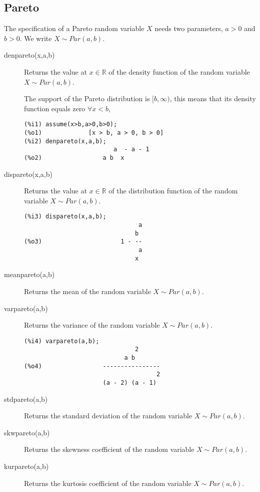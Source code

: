 \documentclass[12pt,a4paper]{article}
\newcommand{\R}{\mathbb{R}}
\begin{document}
\subsection{Pareto}

The specification of a Pareto random variable $X$ needs two parameters, $a>0$ and $b>0$. We write $X \sim Par(a,b)$.

\begin{description}

\item[denpareto(x,a,b)] Returns the value at $x \in \R$ of the density function of the random variable $X \sim Par(a,b)$.

The support of the Pareto distribution is $[b,\infty)$, this means that its density function equals zero $\forall x<b$,
\begin{verbatim}
(%i1) assume(x>b,a>0,b>0);
(%o1)             [x > b, a > 0, b > 0]
(%i2) denpareto(x,a,b);
                         a  - a - 1
(%o2)                 a b  x
\end{verbatim}

\item[dispareto(x,a,b)] Returns the value at $x \in \R$ of the distribution function of the random variable $X \sim Par(a,b)$.

\begin{verbatim}
(%i3) dispareto(x,a,b);
                                a
                               b
(%o3)                      1 - --
                                a
                               x
\end{verbatim}

\item[meanpareto(a,b)] Returns the mean of the random variable  $X \sim Par(a,b)$.

\item[varpareto(a,b)] Returns the variance of the random variable  $X \sim Par(a,b)$.

\begin{verbatim}
(%i4) varpareto(a,b);
                               2
                            a b
(%o4)                 ----------------
                                     2
                      (a - 2) (a - 1)
\end{verbatim}

\item[stdpareto(a,b)] Returns the standard deviation of the random variable  $X \sim Par(a,b)$.

\item[skwpareto(a,b)] Returns the skewness coefficient of the random variable  $X \sim Par(a,b)$.

\item[kurpareto(a,b)] Returns the kurtosis coefficient of the random variable  $X \sim Par(a,b)$.

\end{description}
\end{document}
